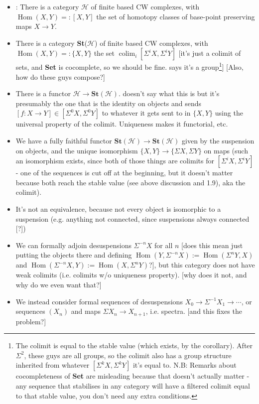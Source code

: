 \documentclass{MetricNotes2023}
\DeclareMathOperator{\colim}{colim}
\DeclareMathOperator{\Hom}{Hom}
\begin{document}
\begin{itemize}
\item \autocite{ass}: There is a category \(\mathcal{H}\) of finite %
based CW  complexes, with \(\Hom(X, Y)=:[X, Y]\) the set of homotopy classes of base-point preserving maps \(X\to Y\).
\item There is a category \textbf{St}(\(\mathcal{H}\)) of finite based CW complexes, with \(\Hom(X, Y)=:\{X, Y\}\) the  set \(\colim_i [\Sigma^iX, \Sigma^iY]\) [it's just a colimit of sets, and \textbf{Set} is cocomplete, so we should be fine. \autocite{ass} says it's a group\footnote{The colimit is equal to the stable value (which exists, by the corollary). After \(\Sigma^2\), these guys are all groups, so the colimit also has a group structure inherited from whatever \([\Sigma^k X, \Sigma^k Y]\) it's equal to. N.B: Remarks about cocompleteness of \textbf{Set} are misleading because that doesn't actually matter - any sequence that stabilises in any category will have a filtered colimit equal to that stable value, you don't need any extra conditions.}] [Also, how do these guys compose?]
\item There is a functor \(\mathcal{H}\to \textbf{St}(\mathcal{H})\). \autocite{ass} doesn't say what this is but it's presumably the one that is the identity on objects and sends \([f : X \to Y]\in [\Sigma^0X, \Sigma^0Y]\) to whatever it gets sent to in \(\{X, Y\}\) using the universal property of the colimit. Uniqueness makes it functorial, etc.
\item We have a fully faithful functor \(\textbf{St}(\mathcal{H})\to \textbf{St}(\mathcal{H})\) given by the suspension on objects, and the unique isomorphism \(\{X, Y\}\to\{\Sigma X, \Sigma Y\}\) on maps (such an isomorphism exists, since both of those things are colimits for \([\Sigma^i X, \Sigma^i Y]\) - one of the sequences is cut off at the beginning, but it doesn't matter because both reach the stable value (see above discussion and \autocite{ass} 1.9), aka the colimit). 
\item It's not an equivalence, because not every object is isomorphic to a suspension (e.g. anything not connected, since suspensions always connected [?])
\item We can formally adjoin desuspensions \(\Sigma^{-n}X\) for all \(n\) [does this mean just putting the objects there and defining \(\Hom(Y, \Sigma^{-n}X):=\Hom(\Sigma^nY, X)\) and \(\Hom(\Sigma^{-n}X, Y):=\Hom(X, \Sigma^n Y)\)?], but this category does not have weak colimits (i.e. colimits w/o uniqueness property). [why does it not, and why do we even want that?]
\item We instead consider formal sequences of desuspensions \(X_0 \to \Sigma^{-1}X_1 \to \cdots\), or sequences \((X_n)\) and maps \(\Sigma X_n \to X_{n+1}\), i.e. spectra. [and this fixes the problem?]
\end{itemize}
\end{document}
